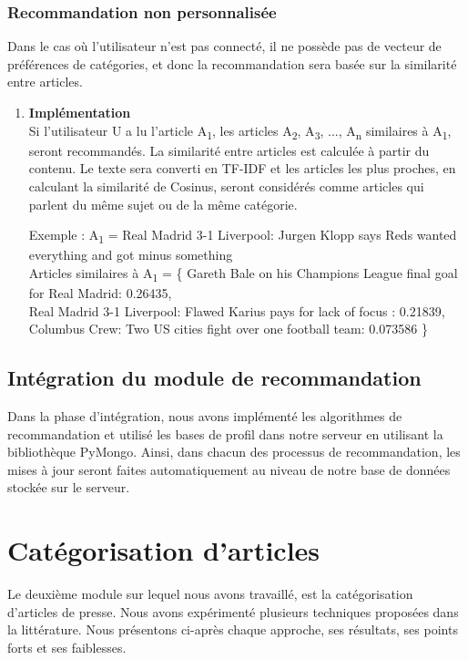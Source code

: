         \subsubsection{Recommandation non personnalisée}
        Dans le cas où l'utilisateur n'est pas connecté, il ne possède pas de vecteur de préférences de catégories, et donc la recommandation sera basée sur la similarité entre articles.
            \begin{enumerate}[leftmargin=*]
                \item\textbf{Implémentation}\\
                Si l'utilisateur U a lu l'article A\textsubscript{1}, les articles A\textsubscript{2}, A\textsubscript{3}, ..., A\textsubscript{n} similaires à A\textsubscript{1}, seront recommandés. La similarité entre articles est calculée à partir du contenu. Le texte sera converti en TF-IDF et les articles les plus proches, en calculant la similarité de Cosinus, seront considérés comme articles qui parlent du même sujet ou de la même catégorie.

                 Exemple : A\textsubscript{1} = \textquotedbl Real Madrid 3-1 Liverpool: Jurgen Klopp says Reds wanted everything and got minus something\textquotedbl\\
                    Articles similaires à A\textsubscript{1} = \{
                    \textquotedbl Gareth Bale on his Champions League final goal for Real Madrid\textquotedbl: 0.26435,\\
                    \textquotedbl Real Madrid 3-1 Liverpool: Flawed Karius pays for lack of focus \textquotedbl: 0.21839,\\
                    \textquotedbl Columbus Crew: Two US cities fight over one football team\textquotedbl: 0.073586
                    \}
                \end{enumerate}
    \subsection{Intégration du module de recommandation}
   Dans la phase d'intégration, nous avons implémenté les algorithmes de recommandation et utilisé les bases de profil dans notre serveur en utilisant la bibliothèque PyMongo. Ainsi, dans chacun des processus de recommandation, les mises à jour seront faites automatiquement au niveau de notre base de données stockée sur le serveur.

\section{Catégorisation d'articles}
Le deuxième module sur lequel nous avons travaillé, est la catégorisation d'articles de presse. Nous avons expérimenté plusieurs techniques proposées dans la littérature. Nous présentons ci-après chaque approche, ses résultats, ses points forts et ses faiblesses.

